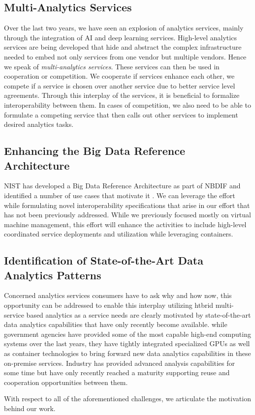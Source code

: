 \subsection{Multi-Analytics Services}

Over the last two years, we have seen an explosion of analytics
services, mainly through the integration of AI and deep learning
services. High-level analytics services are being developed that hide
and abstract the complex infrastructure needed to embed not only
services from one vendor but multiple vendors. Hence we speak of {\em
multi-analytics services}. These services can then be used in
cooperation or competition. We cooperate if services enhance each
other, we compete if a service is chosen over another service due to
better service level agreements. Through this interplay of the
services, it is beneficial to formalize interoperability between
them. In cases of competition, we also need to be able to formulate a
competing service that then calls out other services to implement
desired analytics tasks.

\subsection{Enhancing the Big Data Reference Architecture}
\label{s:arch}

NIST has developed a Big Data Reference Architecture as part of
NBDIF\cite{nist-v6} and identified a number of use cases that motivate
it \cite{nist-v3}. We can leverage the effort
~\cite{nist-v1,nist-v2,nist-v3,nist-v4,nist-v5,nist-v6,nist-v7,nist-v8,nist-v9}
while formulating novel interoperability specifications that arise in
our effort that has not been previously addressed. While we previously focused
mostly on virtual machine management, this effort will enhance the
activities to include high-level coordinated service deployments and
utilization while leveraging containers.

\subsection{Identification of State-of-the-Art Data Analytics Patterns}

Concerned analytics services consumers have to ask why and how now,
this opportunity can be addressed to enable this interplay utilizing
htbrid multi-service based analytics as a service needs are clearly
motivated by state-of-the-art data analytics capabilities that have
only recently become available.  while government agencies have
provided some of the most capable high-end computing systems over the
last years, they have tightly integrated specialized GPUs as well as
container technologies to bring forward new data analytics
capabilities in these on-premise services. Industry has provided
advanced analysis capabilities for some time but have only recently
reached a maturity supporting reuse and cooperation opportunities
between them.

With respect to all of the aforementioned challenges, we articulate 
the motivation behind our work. 


